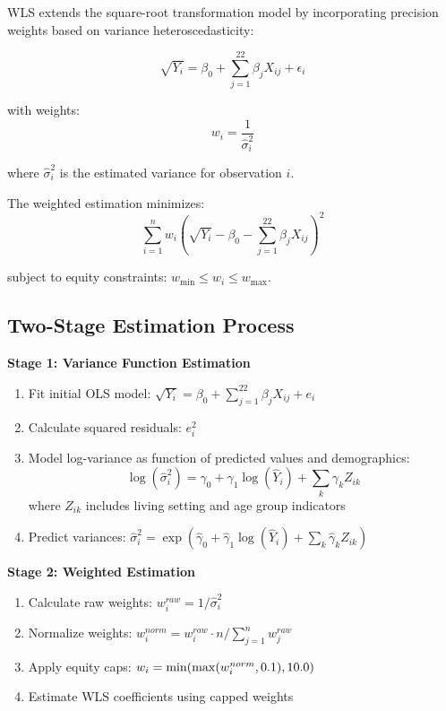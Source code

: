 WLS extends the square-root transformation model by incorporating precision weights based on variance heteroscedasticity:

\begin{equation}
\sqrt{Y_i} = \beta_0 + \sum_{j=1}^{22} \beta_j X_{ij} + \epsilon_i
\end{equation}

with weights:
\begin{equation}
w_i = \frac{1}{\hat{\sigma}_i^2}
\end{equation}

where $\hat{\sigma}_i^2$ is the estimated variance for observation $i$.

The weighted estimation minimizes:
\begin{equation}
\sum_{i=1}^n w_i \left(\sqrt{Y_i} - \beta_0 - \sum_{j=1}^{22} \beta_j X_{ij}\right)^2
\end{equation}

subject to equity constraints: $w_{\min} \leq w_i \leq w_{\max}$.

\subsection{Two-Stage Estimation Process}

\textbf{Stage 1: Variance Function Estimation}
\begin{enumerate}
    \item Fit initial OLS model: $\sqrt{Y_i} = \beta_0 + \sum_{j=1}^{22} \beta_j X_{ij} + e_i$
    \item Calculate squared residuals: $e_i^2$
    \item Model log-variance as function of predicted values and demographics:
    \begin{equation}
    \log(\hat{\sigma}_i^2) = \gamma_0 + \gamma_1 \log(\hat{Y}_i) + \sum_{k} \gamma_k Z_{ik}
    \end{equation}
    where $Z_{ik}$ includes living setting and age group indicators
    \item Predict variances: $\hat{\sigma}_i^2 = \exp(\hat{\gamma}_0 + \hat{\gamma}_1 \log(\hat{Y}_i) + \sum_{k} \hat{\gamma}_k Z_{ik})$
\end{enumerate}

\textbf{Stage 2: Weighted Estimation}
\begin{enumerate}
    \item Calculate raw weights: $w_i^{raw} = 1/\hat{\sigma}_i^2$
    \item Normalize weights: $w_i^{norm} = w_i^{raw} \cdot n / \sum_{j=1}^n w_j^{raw}$
    \item Apply equity caps: $w_i = \min(\max(w_i^{norm}, 0.1{}), 10.0{})$
    \item Estimate WLS coefficients using capped weights
\end{enumerate}

